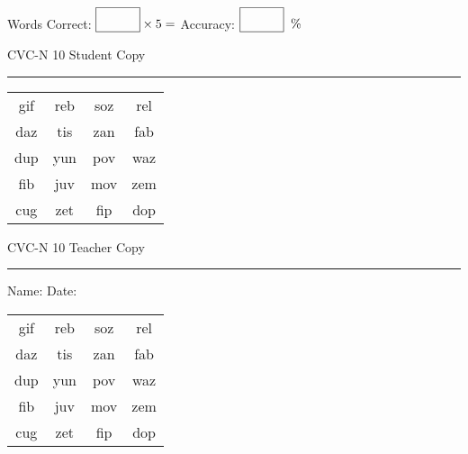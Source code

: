 \documentclass{memoir}
\begin{document}
\small

Words Correct: $\fbox{\phantom{\huge 100}} \times 5 = $ Accuracy: $\fbox{\phantom{\huge 100}}\;\; \%$ 

\vfill

\newpage


\footnotesize \noindent
CVC-N 10 \hfill Student Copy
\smallskip
\hrule

\Large

\setlength{\tabcolsep}{14pt}
\def\arraystretch{2}

{\selectfont


\begin{vplace}[0.5]
\begin{center}
\begin{tabular}{cccc}
gif & reb & soz & rel \\
daz & tis & zan & fab \\
dup & yun & pov & waz \\
fib & juv & mov & zem \\
cug & zet & fip & dop \\
\end{tabular}
\end{center}
\end{vplace}

}

\newpage

\footnotesize \noindent
CVC-N 10 \hfill Teacher Copy
\smallskip
\hrule

\small

\vfill

\noindent
Name: \underline{\hspace{1.75in}} \hfill Date: \underline{\hspace{1in}}

\Large

{\selectfont


\begin{vplace}[0.5]
\begin{center}
\begin{tabular}{cccc}
gif & reb & soz & rel \\
daz & tis & zan & fab \\
dup & yun & pov & waz \\
fib & juv & mov & zem \\
cug & zet & fip & dop \\
\end{tabular}
\end{center}
\end{vplace}



}
\end{document}
